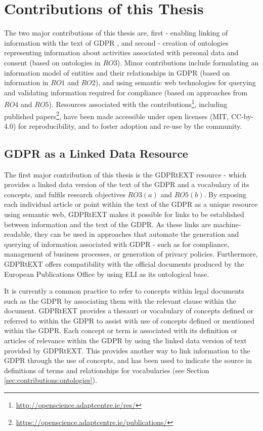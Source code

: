 \section{Contributions of this Thesis}\label{sec:intro:contributions}
The two major contributions of this thesis are, first - enabling linking of information with the text of GDPR , and second - creation of ontologies representing information about activities associated with personal data and consent (based on ontologies in $RO3$). Minor contributions include formulating an information model of entities and their relationships in GDPR (based on information in $RO1$ and $RO2$), and using semantic web technologies for querying and validating information required for compliance (based on approaches from $RO4$ and $RO5$). Resources associated with the contributions\footnote{\url{http://openscience.adaptcentre.ie/res/}}, including published papers\footnote{\url{https://openscience.adaptcentre.ie/publications/}}, have been made accessible under open licenses (MIT,  CC-by-4.0) for reproducibility, and to foster adoption and re-use by the community.

\subsection{GDPR as a Linked Data Resource}
The first major contribution of this thesis is the GDPRtEXT resource - which provides a linked data version of the text of the GDPR and a vocabulary of its concepts, and fulfils research objectives $RO3(a)$ and $RO5(b)$. By exposing each individual article or point within the text of the GDPR as a unique resource using semantic web, GDPRtEXT makes it possible for links to be established between information and the text of the GDPR. As these links are machine-readable, they can be used in approaches that automate the generation and querying of information associated with GDPR - such as for compliance, management of business processes, or generation of privacy policies. Furthermore, GDPRtEXT offers compatibility with the official documents produced by the European Publications Office by using ELI as its ontological base.

It is currently a common practice to refer to concepts within legal documents such as the GDPR by associating them with the relevant clause within the document. 
GDPRtEXT provides a thesauri or vocabulary of concepts defined or referred to within the GDPR to assist with use of concepts defined or mentioned within the GDPR. Each concept or term is associated with its definition or articles of relevance within the GDPR by using the linked data version of text provided by GDPRtEXT. This provides another way to link information to the GDPR through the use of concepts, and has been used to indicate the source in definitions of terms and relationships for vocabularies (see Section \ref{sec:contributions:ontologies}).

